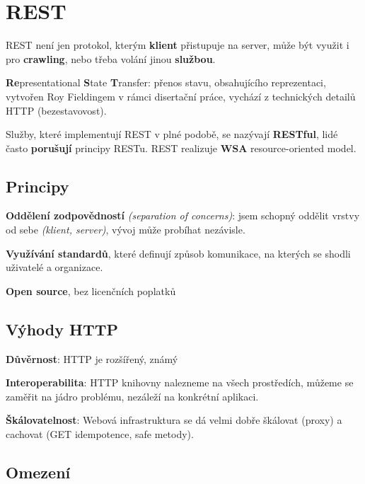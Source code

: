 \section{REST}

REST není jen protokol, kterým \textbf{klient} přistupuje na server, může být využit i pro \textbf{crawling}, nebo třeba volání jinou \textbf{službou}.

\vspace{4pt}
\noindent \textbf{Re}presentational \textbf{S}tate \textbf{T}ransfer: přenos stavu, obsahujícího reprezentaci, vytvořen Roy Fieldingem v rámci disertační práce, vychází z technických detailů HTTP (bezestavovost).

\vspace{4pt}
\noindent Služby, které implementují REST v plné podobě, se nazývají \textbf{RESTful}, lidé často \textbf{porušují} principy RESTu. REST realizuje \textbf{WSA} resource-oriented model.

\subsection{Principy}

\textbf{Oddělení zodpovědností} \textit{(separation of concerns)}: jsem schopný oddělit vrstvy od sebe \textit{(klient, server)}, vývoj může probíhat nezávisle.

\vspace{4pt}
\noindent \textbf{Využívání standardů}, které definují způsob komunikace, na kterých se shodli uživatelé a organizace.

\vspace{4pt}
\noindent \textbf{Open source}, bez licenčních poplatků

\subsection{Výhody HTTP}

\textbf{Důvěrnost}: HTTP je rozšířený, známý

\vspace{4pt}
\noindent \textbf{Interoperabilita}: HTTP knihovny nalezneme na všech prostředích, můžeme se zaměřit na jádro problému, nezáleží na konkrétní aplikaci.

\vspace{4pt}
\noindent \textbf{Škálovatelnost}: Webová infrastruktura se dá velmi dobře škálovat (proxy) a cachovat (GET idempotence, safe metody).

\subsection{Omezení}

